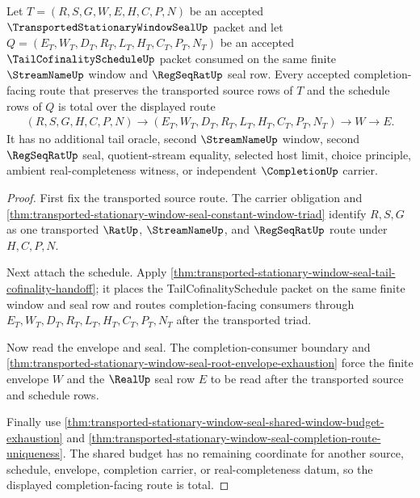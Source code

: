 \begin{theorem}
\label{thm:transported-stationary-window-seal-tail-route-totality}
Let $T=(R,S,G,W,E,H,C,P,N)$ be an accepted $\TransportedStationaryWindowSealUp$ packet and let $Q=(E_T,W_T,D_T,R_T,L_T,H_T,C_T,P_T,N_T)$ be an accepted $\TailCofinalityScheduleUp$ packet consumed on the same finite $\StreamNameUp$ window and $\RegSeqRatUp$ seal row. Every accepted completion-facing route that preserves the transported source rows of $T$ and the schedule rows of $Q$ is total over the displayed route
$$
\begin{aligned}
  (R,S,G,H,C,P,N)
  \longrightarrow
  (E_T,W_T,D_T,R_T,L_T,H_T,C_T,P_T,N_T)
  \longrightarrow
  W
  \longrightarrow
  E .
\end{aligned}
$$
It has no additional tail oracle, second $\StreamNameUp$ window, second $\RegSeqRatUp$ seal, quotient-stream equality, selected host limit, choice principle, ambient real-completeness witness, or independent $\CompletionUp$ carrier.
\end{theorem}
\begin{proof}
First fix the transported source route. The carrier obligation and \autoref{thm:transported-stationary-window-seal-constant-window-triad} identify $R,S,G$ as one transported $\RatUp$, $\StreamNameUp$, and $\RegSeqRatUp$ route under $H,C,P,N$.

Next attach the schedule. Apply \autoref{thm:transported-stationary-window-seal-tail-cofinality-handoff}; it places the TailCofinalitySchedule packet on the same finite window and seal row and routes completion-facing consumers through $E_T,W_T,D_T,R_T,L_T,H_T,C_T,P_T,N_T$ after the transported triad.

Now read the envelope and seal. The completion-consumer boundary and \autoref{thm:transported-stationary-window-seal-root-envelope-exhaustion} force the finite envelope $W$ and the $\RealUp$ seal row $E$ to be read after the transported source and schedule rows.

Finally use \autoref{thm:transported-stationary-window-seal-shared-window-budget-exhaustion} and \autoref{thm:transported-stationary-window-seal-completion-route-uniqueness}. The shared budget has no remaining coordinate for another source, schedule, envelope, completion carrier, or real-completeness datum, so the displayed completion-facing route is total.
\end{proof}


